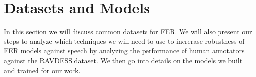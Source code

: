 \section{Datasets and Models}
\label{sec:dataandmodel}
In this section we will discuss common datasets for FER. We will also present our steps to analyze which techniques we will need to use to increrase robustness of FER models against speech by analyzing the performance of human annotators against the RAVDESS dataset. We then go into details on the models we built and trained for our work.


